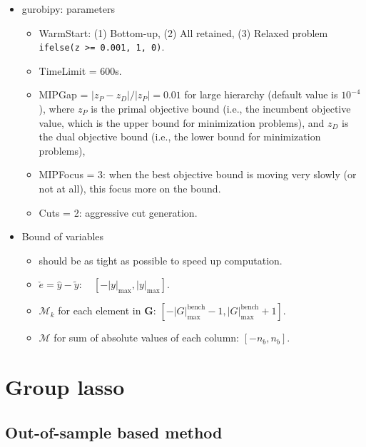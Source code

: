 \documentclass[
  letterpaper,
  DIV=11,
  numbers=noendperiod]{scrartcl}
\providecommand{\tightlist}{%
  \setlength{\itemsep}{0pt}\setlength{\parskip}{0pt}}\usepackage{longtable,booktabs,array}
\begin{document}
\begin{itemize}
\item
  gurobipy: parameters

  \begin{itemize}
  \tightlist
  \item
    WarmStart: (1) Bottom-up, (2) All retained, (3) Relaxed problem
    \texttt{ifelse(z\ \textgreater{}=\ 0.001,\ 1,\ 0)}.
  \item
    TimeLimit = 600s.
  \item
    MIPGap = \(\left|z_P-z_D\right| / \left|z_P\right| = 0.01\) for
    large hierarchy (default value is \(10^{-4}\)), where \(z_P\) is the
    primal objective bound (i.e., the incumbent objective value, which
    is the upper bound for minimization problems), and \(z_D\) is the
    dual objective bound (i.e., the lower bound for minimization
    problems),
  \item
    MIPFocus = 3: when the best objective bound is moving very slowly
    (or not at all), this focus more on the bound.
  \item
    Cuts = 2: aggressive cut generation.
  \end{itemize}
\item
  Bound of variables

  \begin{itemize}
  \tightlist
  \item
    should be as tight as possible to speed up computation.
  \item
    \(\check{e} = \hat{y} - \tilde{y}: \quad [-|y|_{\max}, |y|_{\max}]\).
  \item
    \(\mathcal{M}_k\) for each element in \(\boldsymbol{G}\):
    \([-|G|_{\max}^{\text{bench}} - 1, |G|_{\max}^{\text{bench}} + 1]\).
  \item
    \(\mathcal{M}\) for sum of absolute values of each column:
    \([-n_b, n_b]\).
  \end{itemize}
\end{itemize}

\hypertarget{group-lasso}{%
\section{Group lasso}\label{group-lasso}}

\hypertarget{out-of-sample-based-method}{%
\subsection{Out-of-sample based
method}\label{out-of-sample-based-method}}
\end{document}
